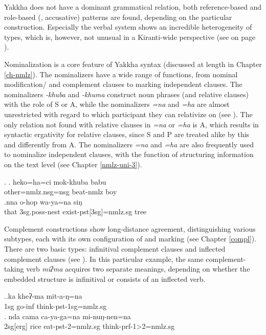 Yakkha does not have a dominant grammatical relation, both reference-based and role-based (, accusative)  patterns are found, depending on the particular construction. Especially the verbal  system shows an incredible heterogeneity of  types, which is, however, not unusual in a Kiranti-wide perspective (see  on page \pageref{aligntables}). 

Nominalization is a core feature of Yakkha syntax (discussed at length in Chapter \ref{ch-nmlz}). The nominalizers have a wide range of functions, from nominal modification/ and complement clauses to marking independent clauses. The nominalizers \emph{-khuba} and \emph{-khuma} construct noun phrases (and relative clauses) with the role of S or A, while the nominalizers \emph{=na} and \emph{=ha} are almost unrestricted with regard to which participant they can relativize on (see \Next). The only relation not found with relative clauses in \emph{=na} or \emph{=ha} is A, which results in syntactic ergativity for relative clauses, since S and P are treated alike by this  and differently from A.
The nominalizers \emph{=na} and \emph{=ha} are also frequently used to nominalize independent clauses, with the function of structuring information  on the text level (see Chapter \ref{nmlz-uni-3}). 

\ex. \ag.   heko=ha=ci mok-khuba babu\\
			other{\sc =nmlz.nsg=nsg} beat{\sc -nmlz} boy\\
\bg.nna  o-hop wa-ya=na siŋ\\
		that {\sc 3sg.poss}-nest exist-{\sc pst[3sg]=nmlz.sg} tree\\
	

Complement constructions show long-distance agreement, distinguishing various subtypes, each with its own configuration of  and  marking (see Chapter \ref{compl}). There are two basic types: infinitival complement clauses and inflected complement clauses (see \Next). In this particular example, the same complement-taking verb \emph{miʔma} acquires two separate meanings, depending on whether the embedded structure is infinitival or consists of an inflected verb.

\ex.\ag.ka kheʔ-ma mit-a-ŋ=na\\
{\sc 1sg} go{\sc -inf} think{\sc -pst-1sg=nmlz.sg}\\
\bg. nda cama ca-ya-ga=na mi-nuŋ-nen=na\\
{\sc 2sg[erg]} rice eat-{\sc pst-2=nmlz.sg} think-{\sc prf-1>2=nmlz.sg}\\



